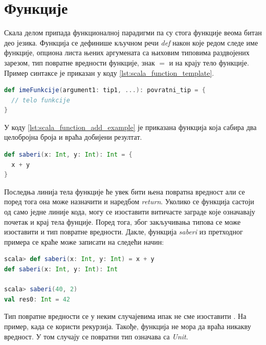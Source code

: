 \documentclass[12pt,oneside]{memoir}
\begin{document}


\section{Функције}
\label{sec:scala_funk}

Скала делом припада функционалној парадигми па су стога функције веома битан део језика. Функција се дефинише кључном речи \textit{def} након које редом следе име функције, опциона листа њених аргумената са њиховим типовима раздвојених зарезом, тип повратне вредности функције, знак $=$ и на крају тело функције. Пример синтаксе је приказан у коду \ref{lst:scala_function_template}.

\begin{lstlisting}[language=Scala, caption={Дефиниција фунције у Скали}, label={lst:scala_function_template}]
def imeFunkcije(argument1: tip1, ...): povratni_tip = {
  // telo funkcije
}

\end{lstlisting}

У коду \ref{lst:scala_function_add_example} је приказана функција која сабира два целобројна броја и враћа добијени резултат. 

\begin{lstlisting}[language=Scala, caption={Дефиниција функције која сабира два целобројна броја}, label={lst:scala_function_add_example}]
def saberi(x: Int, y: Int): Int = {
  x + y
}
\end{lstlisting}

Последња линија тела функције ће увек бити њена повратна вредност али се поред тога она може назначити и наредбом \textit{return}. Уколико се функција састоји од само једне линије кода, могу се изоставити витичасте заграде које означавају почетак и крај тела фунције. Поред тога, због закључивања типова се може изоставити и тип повратне вредности. Дакле, функција \textit{saberi} из претходног примера се краће може записати на следећи начин:

\begin{lstlisting}[language=Scala, caption={Краћи запис функције \textit{saberi}}, label={lst:scala_function_add_example_simplified}]
scala> def saberi(x: Int, y: Int) = x + y
def saberi(x: Int, y: Int): Int

scala> saberi(40, 2)
val res0: Int = 42
\end{lstlisting}

Тип повратне вредности се у неким случајевима ипак не сме изоставити \cite{scala_prog}. На пример, када се користи рекурзија. Такође, функција не мора да враћа никакву вредност. У том случају се повратни тип означава са \textit{Unit}.
\end{document}
